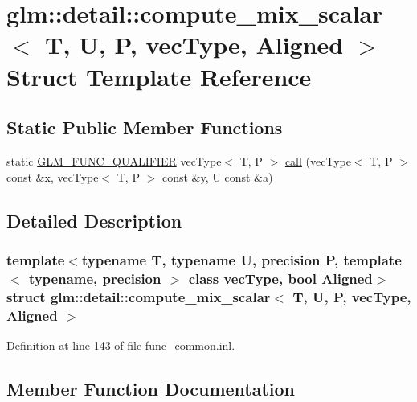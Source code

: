 \hypertarget{structglm_1_1detail_1_1compute__mix__scalar}{}\section{glm\+::detail\+::compute\+\_\+mix\+\_\+scalar$<$ T, U, P, vec\+Type, Aligned $>$ Struct Template Reference}
\label{structglm_1_1detail_1_1compute__mix__scalar}
\subsection*{Static Public Member Functions}
\begin{DoxyCompactItemize}
\item 
static \mbox{\hyperlink{setup_8hpp_a33fdea6f91c5f834105f7415e2a64407}{G\+L\+M\+\_\+\+F\+U\+N\+C\+\_\+\+Q\+U\+A\+L\+I\+F\+I\+ER}} vec\+Type$<$ T, P $>$ \mbox{\hyperlink{structglm_1_1detail_1_1compute__mix__scalar_a594413ef58b3022660f70265353fb690}{call}} (vec\+Type$<$ T, P $>$ const \&\mbox{\hyperlink{glad_8h_a92d0386e5c19fb81ea88c9f99644ab1d}{x}}, vec\+Type$<$ T, P $>$ const \&\mbox{\hyperlink{glad_8h_a66ddd433d2cacfe27f5906b7e86faeed}{y}}, U const \&\mbox{\hyperlink{glad_8h_ac8729153468b5dcf13f971b21d84d4e5}{a}})
\end{DoxyCompactItemize}


\subsection{Detailed Description}
\subsubsection*{template$<$typename T, typename U, precision P, template$<$ typename, precision $>$ class vec\+Type, bool Aligned$>$\newline
struct glm\+::detail\+::compute\+\_\+mix\+\_\+scalar$<$ T, U, P, vec\+Type, Aligned $>$}



Definition at line 143 of file func\+\_\+common.\+inl.



\subsection{Member Function Documentation}
\mbox{\label{structglm_1_1detail_1_1compute__mix__scalar_a594413ef58b3022660f70265353fb690}} 
